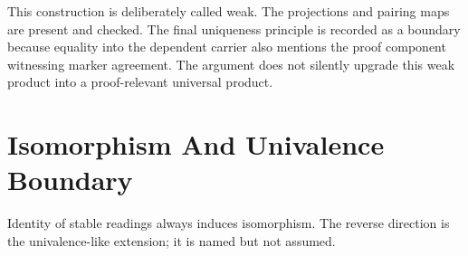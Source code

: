\documentclass[11pt]{article}
\begin{document}
This construction is deliberately called weak.  The projections and
pairing maps are present and checked.  The final uniqueness principle is
recorded as a boundary because equality into the dependent carrier also
mentions the proof component witnessing marker agreement.  The argument does
not silently upgrade this weak product into a proof-relevant universal
product.

\section{Isomorphism And Univalence Boundary}

Identity of stable readings always induces isomorphism.  The reverse
direction is the univalence-like extension; it is named but not assumed.

\begin{code}%
\>[0]\<%
\\
\>[0]\AgdaSpace{}%
%
\>[1976I]\AgdaSymbol{(}\AgdaSpace{}%
\AgdaSymbol{:}\AgdaSpace{}%
\AgdaSymbol{)}\<%
\\
\>[.][@{}l@{}]\<[1976I]%
\>[24]\AgdaSymbol{(}\AgdaSpace{}%
\AgdaSpace{}%
\AgdaSymbol{:}\AgdaSpace{}%
\AgdaSpace{}%
\AgdaSymbol{)}\AgdaSpace{}%
\AgdaSymbol{:}\AgdaSpace{}%
\AgdaSpace{}%
\<%
\\
\>[0][@{}l@{\AgdaIndent{0}}]%
\>[2]\<%
\\
\>[2][@{}l@{\AgdaIndent{0}}]%
\>[4]\AgdaSpace{}%
\AgdaSymbol{:}\AgdaSpace{}%
\AgdaSpace{}%
\AgdaSpace{}%
\AgdaSpace{}%
\<%
\\
%
\>[4]\AgdaSpace{}%
\AgdaSymbol{:}\AgdaSpace{}%
\AgdaSpace{}%
\AgdaSpace{}%
\AgdaSpace{}%
\<%
\\
%
\>[4]\AgdaSpace{}%
\AgdaSymbol{:}\AgdaSpace{}%
\AgdaSpace{}%
\AgdaSpace{}%
\AgdaSpace{}%
\<%
\\
\>[4][@{}l@{\AgdaIndent{0}}]%
\>[6]\AgdaSymbol{(}\AgdaSpace{}%

\end{code}
\end{document}
